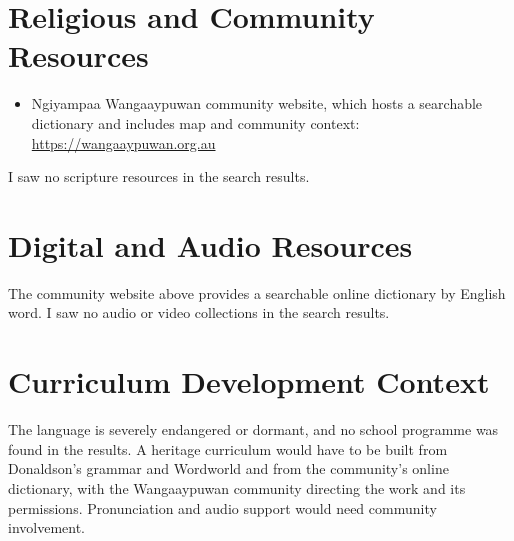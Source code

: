 \documentclass[12pt]{article}
\begin{document}
\section{Religious and Community Resources}
\begin{itemize}
\item Ngiyampaa Wangaaypuwan community website, which hosts a searchable dictionary and includes map and community context: \url{https://wangaaypuwan.org.au}
\end{itemize}
I saw no scripture resources in the search results.

\section{Digital and Audio Resources}
The community website above provides a searchable online dictionary by English word. I saw no audio or video collections in the search results.

\section{Curriculum Development Context}
The language is severely endangered or dormant, and no school programme was found in the results. A heritage curriculum would have to be built from Donaldson's grammar and Wordworld and from the community's online dictionary, with the Wangaaypuwan community directing the work and its permissions. Pronunciation and audio support would need community involvement.
\end{document}
